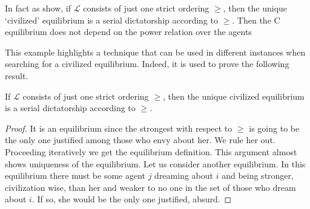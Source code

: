 
    



\color{black}{A language truly brings civilization to a jungle if it has more than one criterion.}\color{black}{} In fact as \cite[RY]{RY} show, if $\mathcal{L}$ consists of just one strict ordering $\geq$, then the unique `civilized' equilibrium is a serial dictatorship according to $\geq$. Then the C equilibrium does not depend on the power relation over the agents\color{black}{ and the civilized jungle is just a normal jungle with another power relation.}  \color{black} 

This example highlights a technique that can be used in different instances when searching for a civilized equilibrium. Indeed, it is used to prove the following result.

\begin{proposition}\label{prop: strict ordering}
    If $\mathcal{L}$ consists of just one strict ordering $\geq$, then the unique civilized equilibrium is a serial dictatorship according to $\geq$.
    \begin{proof}
        It is an equilibrium since the strongest with respect to $\geq$ is going to be the only one justified among those who envy about her. We rule her out. Proceeding iteratively we get the equilibrium definition. This argument almost shows uniqueness of the equilibrium. Let us consider another equilibrium. In this equilibrium there must be some agent $j$ dreaming about $i$ and being stronger, civilization wise, than her and weaker to no one in the set of those who dream about $i$. If so, she would be the only one justified, absurd.
    \end{proof}
\end{proposition}

